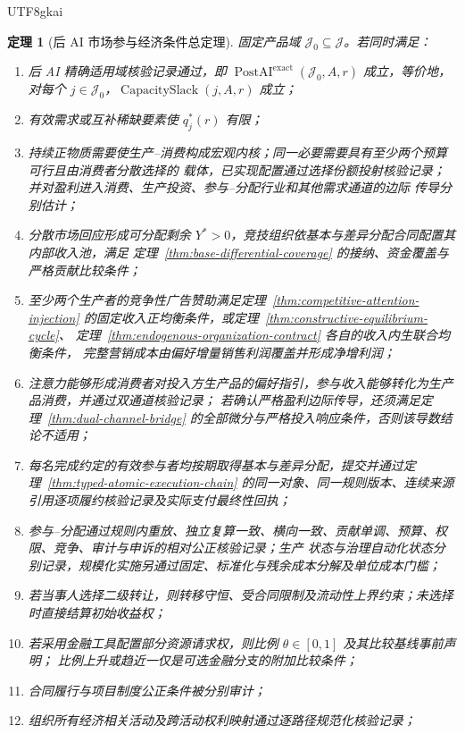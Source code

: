 \documentclass[12pt,a4paper,openany]{report}
\newtheorem{theorem}{定理}[chapter]
\newcommand{\Goods}{\mathcal J}
\DeclareMathOperator{\CapacitySlack}{CapacitySlack}
\DeclareMathOperator{\PostAI}{PostAI}
\begin{document}
\begin{CJK*}{UTF8}{gkai}
\begin{theorem}[后 AI 市场参与经济条件总定理]
\label{thm:governance-economy-synthesis}
固定产品域 \(\Goods_0\subseteq\Goods\)。若同时满足：
\begin{enumerate}[label=\textnormal{C\arabic*:},leftmargin=3.5em]
  \item 后 AI 精确适用域核验记录通过，即
  \(\PostAI^{\mathrm{exact}}(\Goods_0,A,r)\) 成立，等价地，对每个
  \(j\in\Goods_0\)，\(\CapacitySlack(j,A,r)\) 成立；
  \item 有效需求或互补稀缺要素使 \(q_j^*(r)\) 有限；
  \item 持续正物质需要使生产--消费构成宏观内核；同一必要需要具有至少两个预算可行且由消费者分散选择的
  载体，已实现配置通过选择份额投射核验记录；并对盈利进入消费、生产投资、参与--分配行业和其他需求通道的边际
  传导分别估计；
  \item 分散市场回应形成可分配剩余 \(Y^*>0\)，竞技组织依基本与差异分配合同配置其内部收入池，满足
  定理~\ref{thm:base-differential-coverage} 的接纳、资金覆盖与严格贡献比较条件；
  \item 至少两个生产者的竞争性广告赞助满足定理~\ref{thm:competitive-attention-injection}
  的固定收入正均衡条件，或定理~\ref{thm:constructive-equilibrium-cycle}、
  定理~\ref{thm:endogenous-organization-contract} 各自的收入内生联合均衡条件，
  完整营销成本由偏好增量销售利润覆盖并形成净增利润；
  \item 注意力能够形成消费者对投入方生产品的偏好指引，参与收入能够转化为生产品消费，并通过双通道核验记录；
  若确认严格盈利边际传导，还须满足定理~\ref{thm:dual-channel-bridge} 的全部微分与严格投入响应条件，否则该导数结论不适用；
  \item 每名完成约定的有效参与者均按期取得基本与差异分配，提交并通过定理~\ref{thm:typed-atomic-execution-chain}
  的同一对象、同一规则版本、连续来源引用逐项履约核验记录及实际支付最终性回执；
  \item 参与--分配通过规则内重放、独立复算一致、横向一致、贡献单调、预算、权限、竞争、审计与申诉的相对公正核验记录；生产
  状态与治理自动化状态分别记录，规模化实施另通过固定、标准化与残余成本分解及单位成本门槛；
  \item 若当事人选择二级转让，则转移守恒、受合同限制及流动性上界约束；未选择时直接结算初始收益权；
  \item 若采用金融工具配置部分资源请求权，则比例 \(\theta\in[0,1]\) 及其比较基线事前声明；
  比例上升或趋近一仅是可选金融分支的附加比较条件；
  \item 合同履行与项目制度公正条件被分别审计；
  \item 组织所有经济相关活动及跨活动权利映射通过逐路径规范化核验记录；

\end{enumerate}
\end{theorem}
\end{CJK*}
\end{document}
